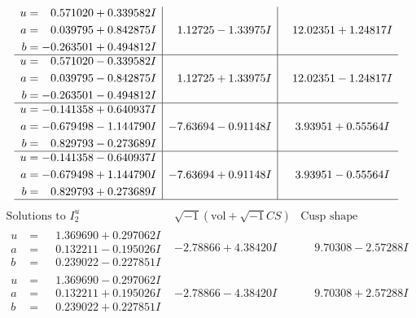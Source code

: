 \documentclass[1p]{elsarticle_modified}
\theoremstyle{definition}
\newcommand{\I}{\sqrt{-1}}
\begin{document}
$$\begin{array}{c|c|c}
\begin{aligned}
u &= \phantom{-}0.571020 + 0.339582 I \\
a &= \phantom{-}0.039795 + 0.842875 I \\
b &= -0.263501 + 0.494812 I\end{aligned}
 & \phantom{-}1.12725 - 1.33975 I & \phantom{-}12.02351 + 1.24817 I \\ \hline\begin{aligned}
u &= \phantom{-}0.571020 - 0.339582 I \\
a &= \phantom{-}0.039795 - 0.842875 I \\
b &= -0.263501 - 0.494812 I\end{aligned}
 & \phantom{-}1.12725 + 1.33975 I & \phantom{-}12.02351 - 1.24817 I \\ \hline\begin{aligned}
u &= -0.141358 + 0.640937 I \\
a &= -0.679498 - 1.144790 I \\
b &= \phantom{-}0.829793 - 0.273689 I\end{aligned}
 & -7.63694 - 0.91148 I & \phantom{-}3.93951 + 0.55564 I \\ \hline\begin{aligned}
u &= -0.141358 - 0.640937 I \\
a &= -0.679498 + 1.144790 I \\
b &= \phantom{-}0.829793 + 0.273689 I\end{aligned}
 & -7.63694 + 0.91148 I & \phantom{-}3.93951 - 0.55564 I\\
 \hline 
 \end{array}$$\newpage$$\begin{array}{c|c|c}  
\text{Solutions to }I^u_{2}& \I (\text{vol} + \sqrt{-1}CS) & \text{Cusp shape}\\
 \hline 
\begin{aligned}
u &= \phantom{-}1.369690 + 0.297062 I \\
a &= \phantom{-}0.132211 - 0.195026 I \\
b &= \phantom{-}0.239022 - 0.227851 I\end{aligned}
 & -2.78866 + 4.38420 I & \phantom{-}9.70308 - 2.57288 I \\ \hline\begin{aligned}
u &= \phantom{-}1.369690 - 0.297062 I \\
a &= \phantom{-}0.132211 + 0.195026 I \\
b &= \phantom{-}0.239022 + 0.227851 I\end{aligned}
 & -2.78866 - 4.38420 I & \phantom{-}9.70308 + 2.57288 I \\ \hline\begin{aligned}

\end{aligned}
\end{array}$$
\end{document}

